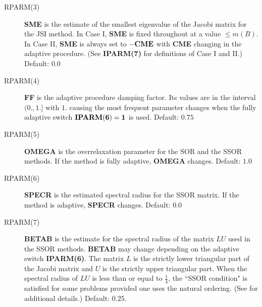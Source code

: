 \begin{description}
 \item[RPARM(3)] {\bf SME} is the estimate of the smallest eigenvalue of 
                 the Jacobi matrix for the JSI method.  In Case I, 
                 {\bf SME} is fixed throughout at a value $\leq m(B)$.
                 In Case II, {\bf SME} is always set to ${\bf -CME}$
                 with {\bf CME} changing in the adaptive procedure.  (See
                 {\bf IPARM(7)} for definitions of Case I and II.)
                 Default: $0.0$
 
 \item[RPARM(4)] {\bf FF} is the adaptive procedure damping factor.  Its 
                 values are in the interval $(0.,1.]$ with $1.$ causing 
                 the most frequent parameter changes when the fully 
                 adaptive switch ${\bf IPARM(6)=1}$ is used.  
                 Default: $0.75$
 
 \item[RPARM(5)] {\bf OMEGA} is the overrelaxation parameter for the SOR 
                 and the SSOR methods.  If the method is fully adaptive, 
                 {\bf OMEGA} changes.  Default: $1.0$
 
 \item[RPARM(6)] {\bf SPECR} is the estimated spectral radius for the 
                 SSOR matrix.  If the method is adaptive, {\bf SPECR} 
                 changes.  Default: $0.0$
 
 \item[RPARM(7)] {\bf BETAB} is the estimate for the spectral radius of the
                 matrix $LU$ used in the SSOR methods.  {\bf BETAB} may 
                 change depending on the adaptive switch {\bf IPARM(6)}.
                 The matrix $L$ is the strictly lower triangular part of 
                 the Jacobi matrix and $U$ is the strictly upper triangular 
                 part.  When the spectral radius of $LU$ is less than or 
                 equal to $\frac{1}{4}$, the ``SSOR condition" is satisfied 
                 for some problems provided one uses the natural ordering.
                 (See \cite{4,5,18} for additional details.)  Default: $0.25$.
 

\end{description}
